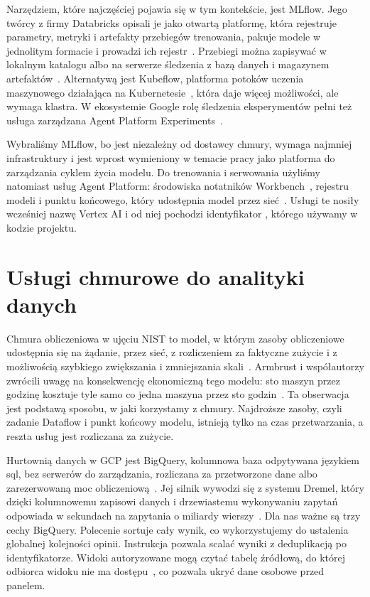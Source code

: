 Narzędziem, które najczęściej pojawia się w tym kontekście, jest MLflow.
Jego twórcy z firmy Databricks opisali je jako otwartą platformę, która rejestruje parametry, metryki i artefakty przebiegów trenowania, pakuje modele w jednolitym formacie i prowadzi ich rejestr~\cite{zaharia2018accelerating}.
Przebiegi można zapisywać w lokalnym katalogu albo na serwerze śledzenia z bazą danych i magazynem artefaktów~\cite{docmlflowtracking}.
Alternatywą jest Kubeflow, platforma potoków uczenia maszynowego działająca na Kubernetesie~\cite{dockubeflow}, która daje więcej możliwości, ale wymaga klastra.
W ekosystemie Google rolę śledzenia eksperymentów pełni też usługa zarządzana Agent Platform Experiments~\cite{docvertexexperiments}.

Wybraliśmy MLflow, bo jest niezależny od dostawcy chmury, wymaga najmniej infrastruktury i jest wprost wymieniony w temacie pracy jako platforma do zarządzania cyklem życia modelu.
Do trenowania i serwowania użyliśmy natomiast usług Agent Platform: środowiska notatników Workbench~\cite{docvertexworkbench}, rejestru modeli i punktu końcowego, który udostępnia model przez sieć~\cite{docvertexdeploy}.
Usługi te nosiły wcześniej nazwę Vertex AI i od niej pochodzi identyfikator , którego używamy w kodzie projektu.

\section{Usługi chmurowe do analityki danych}
\label{sec:tech-cloud}

Chmura obliczeniowa w ujęciu NIST to model, w którym zasoby obliczeniowe udostępnia się na żądanie, przez sieć, z rozliczeniem za faktyczne zużycie i z możliwością szybkiego zwiększania i zmniejszania skali~\cite{mell2011nist}.
Armbrust i współautorzy zwrócili uwagę na konsekwencję ekonomiczną tego modelu: sto maszyn przez godzinę kosztuje tyle samo co jedna maszyna przez sto godzin~\cite{armbrust2010view}.
Ta obserwacja jest podstawą sposobu, w jaki korzystamy z chmury.
Najdroższe zasoby, czyli zadanie Dataflow i punkt końcowy modelu, istnieją tylko na czas przetwarzania, a reszta usług jest rozliczana za zużycie.

Hurtownią danych w GCP jest BigQuery, kolumnowa baza odpytywana językiem \ac{sql}, bez serwerów do zarządzania, rozliczana za przetworzone dane albo zarezerwowaną moc obliczeniową~\cite{docbigquery,lakshmanan2019google}.
Jej silnik wywodzi się z systemu Dremel, który dzięki kolumnowemu zapisowi danych i drzewiastemu wykonywaniu zapytań odpowiada w sekundach na zapytania o miliardy wierszy~\cite{melnik2010dremel}.
Dla nas ważne są trzy cechy BigQuery.
Polecenie  sortuje cały wynik, co wykorzystujemy do ustalenia globalnej kolejności opinii.
Instrukcja  pozwala scalać wyniki z deduplikacją po identyfikatorze.
Widoki autoryzowane mogą czytać tabelę źródłową, do której odbiorca widoku nie ma dostępu~\cite{docauthorizedviews}, co pozwala ukryć dane osobowe przed panelem.

